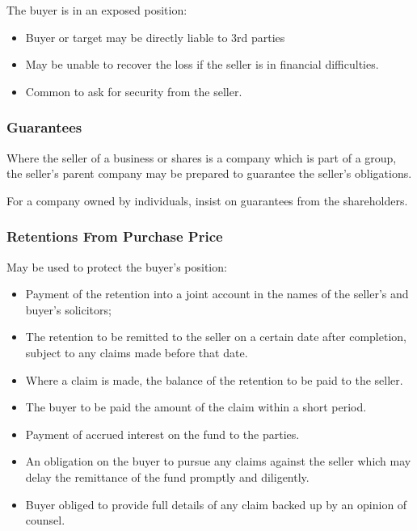 \documentclass[
]{article}
\providecommand{\tightlist}{%
  \setlength{\itemsep}{0pt}\setlength{\parskip}{0pt}}
\begin{document}
The buyer is in an exposed position:

\begin{itemize}
\tightlist
\item
  Buyer or target may be directly liable to 3rd parties
\item
  May be unable to recover the loss if the seller is in financial
  difficulties.
\item
  Common to ask for security from the seller.
\end{itemize}

\hypertarget{guarantees}{%
\subsubsection{Guarantees}\label{guarantees}}

Where the seller of a business or shares is a company which is part of a
group, the seller's parent company may be prepared to guarantee the
seller's obligations.

For a company owned by individuals, insist on guarantees from the
shareholders.

\hypertarget{retentions-from-purchase-price}{%
\subsubsection{Retentions From Purchase
Price}\label{retentions-from-purchase-price}}

May be used to protect the buyer's position:

\begin{itemize}
\tightlist
\item
  Payment of the retention into a joint account in the names of the
  seller's and buyer's solicitors;
\item
  The retention to be remitted to the seller on a certain date after
  completion, subject to any claims made before that date.
\item
  Where a claim is made, the balance of the retention to be paid to the
  seller.
\item
  The buyer to be paid the amount of the claim within a short period.
\item
  Payment of accrued interest on the fund to the parties.
\item
  An obligation on the buyer to pursue any claims against the seller
  which may delay the remittance of the fund promptly and diligently.
\item
  Buyer obliged to provide full details of any claim backed up by an
  opinion of counsel.
\end{itemize}
\end{document}
